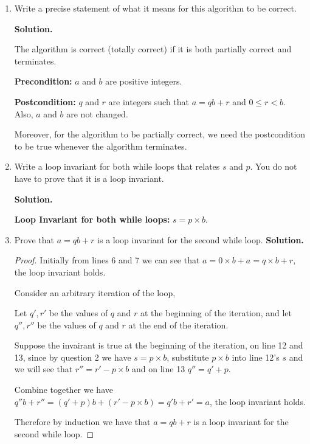 \documentclass[11pt]{article}
\begin{document}
\begin{enumerate}
\item Write a precise statement of what it means for this algorithm to be correct.

{\bf Solution.}

The algorithm is correct (totally correct) if it is both partially correct and terminates.

{\bf Precondition:} $a$ and $b$ are positive integers.

{\bf Postcondition:} $q$ and $r$ are integers such that $a=qb+r$ and $0\leq r<b$. Also, $a$ and $b$ are not changed. 

Moreover, for the algorithm to be partially correct, we need the postcondition to be true whenever the algorithm terminates.\\



\item Write a loop invariant for both while loops that relates $s$ and $p$. You do not have to prove that
it is a loop invariant.

{\bf Solution.}

{\bf Loop Invariant for both while loops:} $s=p\times b$.\\


\item Prove that $ a=qb+r $ is a loop invariant for the second while loop.
{\bf Solution.}

\begin{proof}
    Initially from lines 6 and 7 we can see that $a=0\times b + a = q\times b + r$, the loop invariant holds.

    Consider an arbitrary iteration of the loop,
    \begin{adjustwidth}{1cm}{}
        Let $q', r'$ be the values of $q$ and $r$ at the beginning of the iteration, and let $q'', r''$ be the values of $q$ and $r$ at the end of the iteration.

        Suppose the invairant is true at the beginning of the iteration, on line 12 and 13, since by question 2 we have $s=p\times b$, substitute $p\times b$ into line 12's $s$ and we will see that $r''=r' - p\times b$ and on line 13 $q''=q'+p$.

        Combine together we have $q''b+r'' = (q'+p)b + (r'-p\times b) = q'b + r'=a$, the loop invariant holds.
        
    \end{adjustwidth}

    Therefore by induction we have that $a=qb+r$ is a loop invariant for the second while loop.
    
\end{proof}


\end{enumerate}
\end{document}
